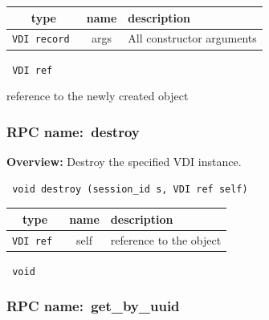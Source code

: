 
 
\vspace{0.3cm}
\begin{tabular}{|c|c|p{7cm}|}
 \hline
{\bf type} & {\bf name} & {\bf description} \\ \hline
{\tt VDI record } & args & All constructor arguments \\ \hline 

\end{tabular}

\vspace{0.3cm}

{\tt 
VDI ref
}


reference to the newly created object
\vspace{0.3cm}
\vspace{0.3cm}
\vspace{0.3cm}
\subsubsection{RPC name:~destroy}

{\bf Overview:} 
Destroy the specified VDI instance.

\begin{verbatim} void destroy (session_id s, VDI ref self)\end{verbatim}



 
\vspace{0.3cm}
\begin{tabular}{|c|c|p{7cm}|}
 \hline
{\bf type} & {\bf name} & {\bf description} \\ \hline
{\tt VDI ref } & self & reference to the object \\ \hline 

\end{tabular}

\vspace{0.3cm}

{\tt 
void
}



\vspace{0.3cm}
\vspace{0.3cm}
\vspace{0.3cm}
\subsubsection{RPC name:~get\_by\_uuid}

